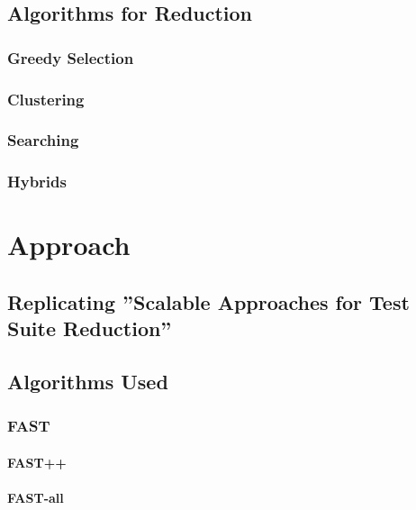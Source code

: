 \documentclass[a4paper,10pt]{article}
\begin{document}
\subsection{Algorithms for Reduction}

\subsubsection{Greedy Selection}


\subsubsection{Clustering}


\subsubsection{Searching}

\subsubsection{Hybrids}

\section{Approach}

\subsection{Replicating ''Scalable Approaches for Test Suite Reduction''}

\subsection{Algorithms Used}

\subsubsection{FAST}

\paragraph{FAST++}

\paragraph{FAST-all}
\end{document}
